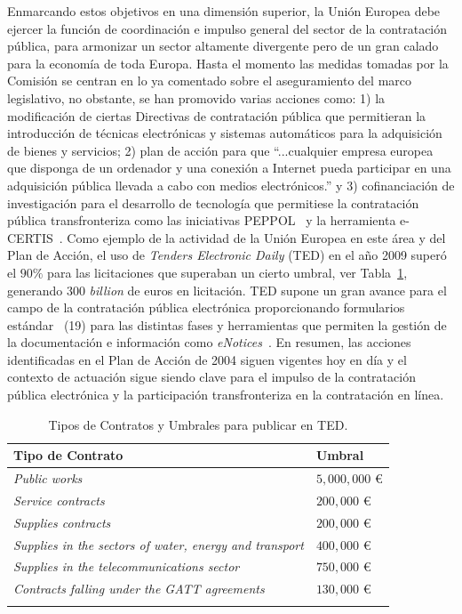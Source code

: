 Enmarcando estos objetivos en una dimensión superior, la Unión Europea debe ejercer la función
de coordinación e impulso general del sector de la contratación pública, para armonizar un sector
altamente divergente pero de un gran calado para la economía de toda Europa. Hasta el momento las
medidas tomadas por la Comisión se centran en lo ya comentado sobre el aseguramiento del marco
legislativo, no obstante, se han promovido varias acciones como: 1) la modificación
de ciertas Directivas de contratación pública que permitieran la introducción de técnicas
electrónicas y sistemas automáticos para la adquisición de bienes y servicios; 2) plan
de acción para que ``...cualquier empresa europea que disponga de un ordenador y una conexión a
 Internet pueda participar en una adquisición pública llevada a cabo con medios electrónicos.''
y 3) cofinanciación de investigación para el desarrollo de tecnología que permitiese
la contratación pública transfronteriza como las iniciativas \gls{PEPPOL}~\cite{peppol} y la herramienta e-CERTIS~\cite{e-certis}. Como ejemplo
de la actividad de la Unión Europea en este área y del Plan de Acción, el uso 
de \textit{Tenders Electronic Daily} (\gls{TED}) en el año 2009 superó el $90\%$ para las licitaciones
que superaban un cierto umbral, ver Tabla~\ref{umbralesTed}, generando $300$ \textit{billion} de euros en licitación. TED supone un gran avance para el campo de la contratación
pública electrónica proporcionando formularios estándar~\cite{formsTed} (19) para las distintas fases y herramientas que permiten
la gestión de la documentación e información como \textit{eNotices}~\cite{eNotices}. En resumen, las acciones identificadas en el Plan de Acción de 2004 
siguen vigentes hoy en día y el contexto de actuación sigue siendo clave para el impulso de la contratación
pública electrónica y la participación transfronteriza en la contratación 
en línea.

\begin{longtable}[c]{|p{9cm}|p{3cm}|} 
\hline
  \textbf{Tipo de Contrato} & \textbf{Umbral} \\\hline
\endhead
\textit{Public works} & $5,000,000$ \euro \\ \hline 
\textit{Service contracts}&$200,000$ \euro \\ \hline 
\textit{Supplies contracts}& $200,000$ \euro \\ \hline 
\textit{Supplies in the sectors of water, energy and transport}&$400,000$ \euro \\ \hline
\textit{Supplies in the telecommunications sector}&	$750,000$ \euro \\ \hline 
\textit{Contracts falling under the GATT agreements}&	$130,000$ \euro \\ \hline
 \hline
\caption{Tipos de Contratos y Umbrales para publicar en TED.}\label{umbralesTed}\\    
\end{longtable}


